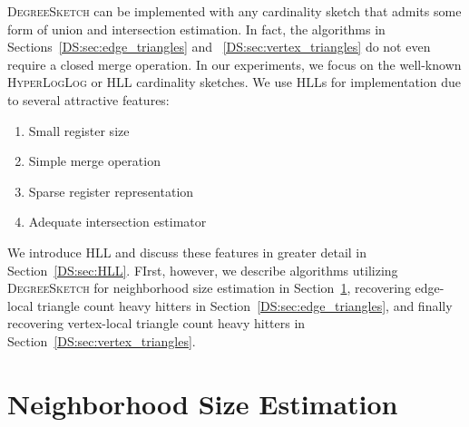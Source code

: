 \documentclass[10]{article}
\newcommand{\algoname}[1]{\textnormal{\textsc{#1}}}
\begin{document}
\algoname{DegreeSketch} can be implemented with any cardinality sketch that admits some form of union and intersection estimation.
In fact, the algorithms in Sections~\ref{DS:sec:edge_triangles} and ~\ref{DS:sec:vertex_triangles} do not even require a closed merge operation.
In our experiments, we focus on the well-known \algoname{HyperLogLog} or \algoname{HLL} cardinality sketches.
We use \algoname{HLL}s for implementation due to several attractive features:
\begin{enumerate}
	\item Small register size
	\item Simple merge operation
	\item Sparse register representation
	\item Adequate intersection estimator
\end{enumerate}

We introduce \algoname{HLL} and discuss these features in greater detail in Section~\ref{DS:sec:HLL}.
FIrst, however, we describe algorithms utilizing \algoname{DegreeSketch} for neighborhood size estimation in Section~\ref{DS:sec:neighborhoods}, recovering edge-local triangle count heavy hitters in Section~\ref{DS:sec:edge_triangles}, and finally recovering vertex-local triangle count heavy hitters in Section~\ref{DS:sec:vertex_triangles}.

\section{Neighborhood Size Estimation}
 \label{DS:sec:neighborhoods}
\end{document}
